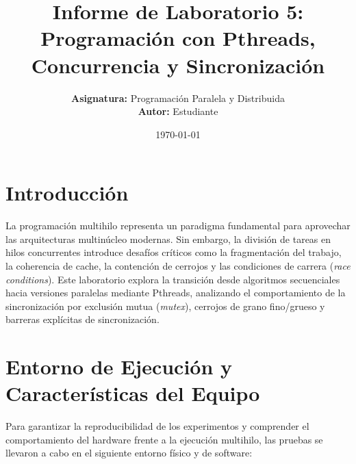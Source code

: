 \documentclass[11pt,a4paper]{article}
\title{\textbf{Informe de Laboratorio 5: Programación con Pthreads, Concurrencia y Sincronización}}
\author{\textbf{Asignatura:} Programación Paralela y Distribuida \\ \textbf{Autor:} Estudiante}
\date{\today}
\begin{document}



\section{Introducción}
La programación multihilo representa un paradigma fundamental para aprovechar las arquitecturas multinúcleo modernas. Sin embargo, la división de tareas en hilos concurrentes introduce desafíos críticos como la fragmentación del trabajo, la coherencia de cache, la contención de cerrojos y las condiciones de carrera (\textit{race conditions}). Este laboratorio explora la transición desde algoritmos secuenciales hacia versiones paralelas mediante Pthreads, analizando el comportamiento de la sincronización por exclusión mutua (\textit{mutex}), cerrojos de grano fino/grueso y barreras explícitas de sincronización.






\section{Entorno de Ejecución y Características del Equipo}

Para garantizar la reproducibilidad de los experimentos y comprender el comportamiento del hardware frente a la ejecución multihilo, las pruebas se llevaron a cabo en el siguiente entorno físico y de software:
\end{document}

